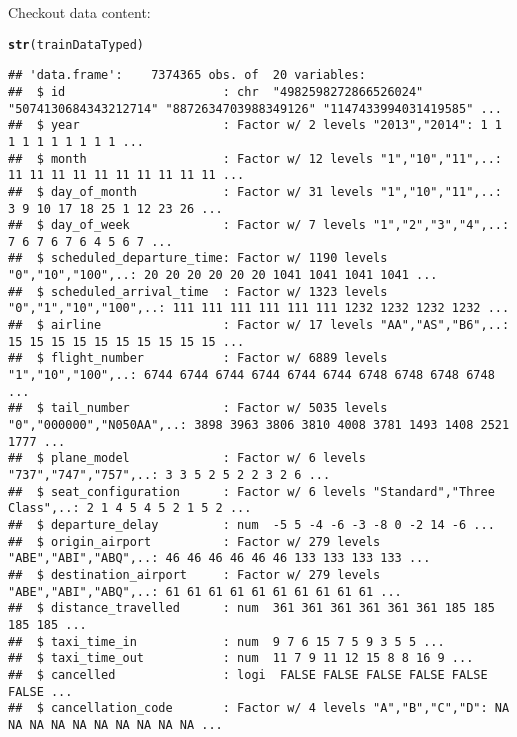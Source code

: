 \documentclass{article}\usepackage[]{graphicx}\usepackage[]{color}
\makeatletter
\newcommand{\hlstd}[1]{\textcolor[rgb]{0.345,0.345,0.345}{#1}}%
\newcommand{\hlkwd}[1]{\textcolor[rgb]{0.737,0.353,0.396}{\textbf{#1}}}%
\newenvironment{kframe}{%
 \def\at@end@of@kframe{}%
 \ifinner\ifhmode%
  \def\at@end@of@kframe{\end{minipage}}%
  \begin{minipage}{\columnwidth}%
 \fi\fi%
 \def\FrameCommand##1{\hskip\@totalleftmargin \hskip-\fboxsep
 \colorbox{shadecolor}{##1}\hskip-\fboxsep
     \hskip-\linewidth \hskip-\@totalleftmargin \hskip\columnwidth}%
 \MakeFramed {\advance\hsize-\width
   \@totalleftmargin\z@ \linewidth\hsize
   \@setminipage}}%
 {\par\unskip\endMakeFramed%
 \at@end@of@kframe}
\newenvironment{knitrout}{}{} %
\makeatother
\begin{document}
Checkout data content:
\begin{knitrout}
\color{fgcolor}\begin{kframe}
\begin{alltt}
\hlkwd{str}\hlstd{(trainDataTyped)}
\end{alltt}
\begin{verbatim}
## 'data.frame':	7374365 obs. of  20 variables:
##  $ id                      : chr  "4982598272866526024" "5074130684343212714" "8872634703988349126" "1147433994031419585" ...
##  $ year                    : Factor w/ 2 levels "2013","2014": 1 1 1 1 1 1 1 1 1 1 ...
##  $ month                   : Factor w/ 12 levels "1","10","11",..: 11 11 11 11 11 11 11 11 11 11 ...
##  $ day_of_month            : Factor w/ 31 levels "1","10","11",..: 3 9 10 17 18 25 1 12 23 26 ...
##  $ day_of_week             : Factor w/ 7 levels "1","2","3","4",..: 7 6 7 6 7 6 4 5 6 7 ...
##  $ scheduled_departure_time: Factor w/ 1190 levels "0","10","100",..: 20 20 20 20 20 20 1041 1041 1041 1041 ...
##  $ scheduled_arrival_time  : Factor w/ 1323 levels "0","1","10","100",..: 111 111 111 111 111 111 1232 1232 1232 1232 ...
##  $ airline                 : Factor w/ 17 levels "AA","AS","B6",..: 15 15 15 15 15 15 15 15 15 15 ...
##  $ flight_number           : Factor w/ 6889 levels "1","10","100",..: 6744 6744 6744 6744 6744 6744 6748 6748 6748 6748 ...
##  $ tail_number             : Factor w/ 5035 levels "0","000000","N050AA",..: 3898 3963 3806 3810 4008 3781 1493 1408 2521 1777 ...
##  $ plane_model             : Factor w/ 6 levels "737","747","757",..: 3 3 5 2 5 2 2 3 2 6 ...
##  $ seat_configuration      : Factor w/ 6 levels "Standard","Three Class",..: 2 1 4 5 4 5 2 1 5 2 ...
##  $ departure_delay         : num  -5 5 -4 -6 -3 -8 0 -2 14 -6 ...
##  $ origin_airport          : Factor w/ 279 levels "ABE","ABI","ABQ",..: 46 46 46 46 46 46 133 133 133 133 ...
##  $ destination_airport     : Factor w/ 279 levels "ABE","ABI","ABQ",..: 61 61 61 61 61 61 61 61 61 61 ...
##  $ distance_travelled      : num  361 361 361 361 361 361 185 185 185 185 ...
##  $ taxi_time_in            : num  9 7 6 15 7 5 9 3 5 5 ...
##  $ taxi_time_out           : num  11 7 9 11 12 15 8 8 16 9 ...
##  $ cancelled               : logi  FALSE FALSE FALSE FALSE FALSE FALSE ...
##  $ cancellation_code       : Factor w/ 4 levels "A","B","C","D": NA NA NA NA NA NA NA NA NA NA ...
\end{verbatim}
\end{kframe}
\end{knitrout}
\end{document}
